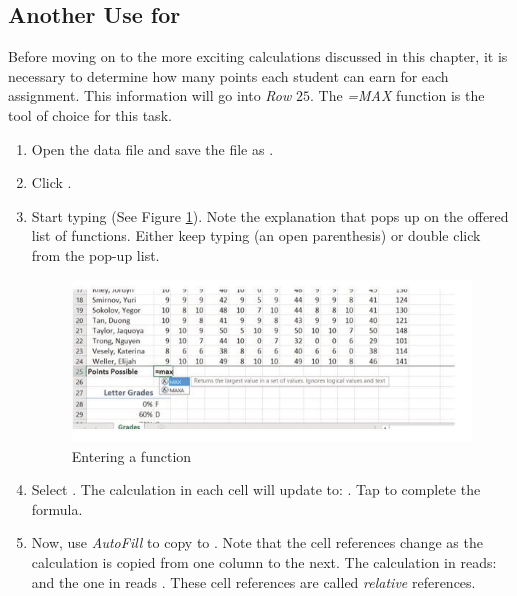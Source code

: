 \subsection{Another Use for }

Before moving on to the more exciting calculations discussed in this chapter, it is necessary to determine how many points each student can earn for each assignment. This information will go into \textit{Row} $ 25 $. The \textit{=MAX} function is the tool of choice for this task.

\begin{enumbox}
	\begin{enumerate}
		\item Open the data file  and save the file as .
		\item Click .
		\item Start typing  (See Figure \ref{03:fig02}). Note the explanation that pops up on the offered list of functions. Either keep typing \fmtTyping{(} (an open parenthesis) or double click  from the pop-up list.

		\begin{figure}[H]
			\centering
			\includegraphics[width=\maxwidth{.95\linewidth}]{gfx/ch03_fig02}
			\caption{Entering a function}
			\label{03:fig02}
		\end{figure}
	
		\item Select . The calculation in each cell will update to: . Tap  to complete the formula.
		\item Now, use \textit{AutoFill} to copy  to . Note that the cell references change as the calculation is copied from one column to the next. The calculation in  reads:  and the one in  reads . These cell references are called \textit{relative} references.
	\end{enumerate}
\end{enumbox}

